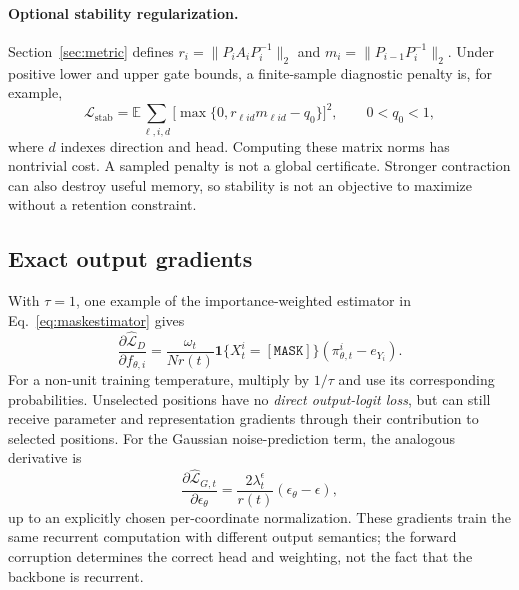 \documentclass{article}
\theoremstyle{remark}\newtheorem{remark}[theorem]{Remark}
\newcommand{\E}{\mathbb E}
\newcommand{\mask}{\mathtt{[MASK]}}
\begin{document}
\paragraph{Optional stability regularization.}
Section~\ref{sec:metric} defines $r_i=\|P_iA_iP_i^{-1}\|_2$ and $m_i=\|P_{i-1}P_i^{-1}\|_2$. Under positive lower and upper gate bounds, a finite-sample diagnostic penalty is, for example,
\begin{equation}
 \mathcal L_{\mathrm{stab}}=\E\sum_{\ell,i,d}
 \bigl[\max\{0,r_{\ell i d}m_{\ell i d}-q_0\}\bigr]^2,
 \qquad 0<q_0<1,
 \label{eq:stabpenalty}
\end{equation}
where $d$ indexes direction and head. Computing these matrix norms has nontrivial cost. A sampled penalty is not a global certificate. Stronger contraction can also destroy useful memory, so stability is not an objective to maximize without a retention constraint.

\subsection{Exact output gradients}
With $\tau=1$, one example of the importance-weighted estimator in Eq.~\eqref{eq:maskestimator} gives
\begin{equation}
 \frac{\partial\widehat{\mathcal L}_D}{\partial f_{\theta,i}}
 =\frac{\omega_t}{Nr(t)}\mathbf1\{X_t^i=\mask\}
 \left(\pi_{\theta,t}^i-e_{Y_i}\right).
 \label{eq:logitgradient}
\end{equation}
For a non-unit training temperature, multiply by $1/\tau$ and use its corresponding probabilities. Unselected positions have no \emph{direct output-logit loss}, but can still receive parameter and representation gradients through their contribution to selected positions. For the Gaussian noise-prediction term, the analogous derivative is
\begin{equation}
 \frac{\partial\widehat{\mathcal L}_{G,t}}{\partial\epsilon_\theta}
 =\frac{2\lambda_t^\epsilon}{r(t)}(\epsilon_\theta-\epsilon),
 \label{eq:noisegradient}
\end{equation}
up to an explicitly chosen per-coordinate normalization. These gradients train the same recurrent computation with different output semantics; the forward corruption determines the correct head and weighting, not the fact that the backbone is recurrent.
\end{document}
